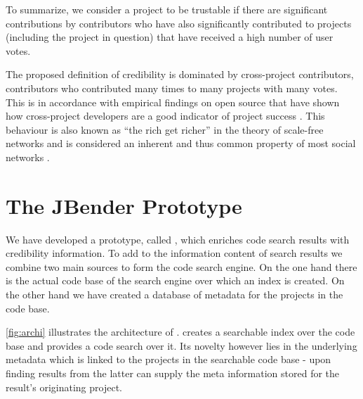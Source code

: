 To summarize, we consider a project to be trustable if there are significant contributions by contributors who have also significantly contributed to projects (including the project in question) that have received a high number of user votes.

The proposed definition of credibility is dominated by cross-project contributors, \ie contributors who contributed many times to many projects with many votes. This is in accordance with empirical findings on open source that have shown how cross-project developers are a good indicator of project success \cite{Kats07a}. This behaviour is also known as ``the rich get richer'' in the theory of scale-free networks and is considered an inherent and thus common property of most social networks \cite{Bara03a}.

\section{The JBender Prototype}
\label{sec:approach}

We have developed a prototype, called \Jbd, which enriches code search results with credibility information. To add to the information content of search results we combine two main sources to form the \Jbd code search engine. On the one hand there is the actual code base of the search engine over which an index is created. On the other hand we have created a database of metadata for the projects in the code base. 

\autoref{fig:archi} illustrates the architecture of \Jbd. \Jbd creates a searchable index over the code base and provides a code search over it. Its novelty however lies in the underlying metadata which is linked to the projects in the searchable code base - upon finding results from the latter \Jbd can supply the meta information stored for the result's originating project.


